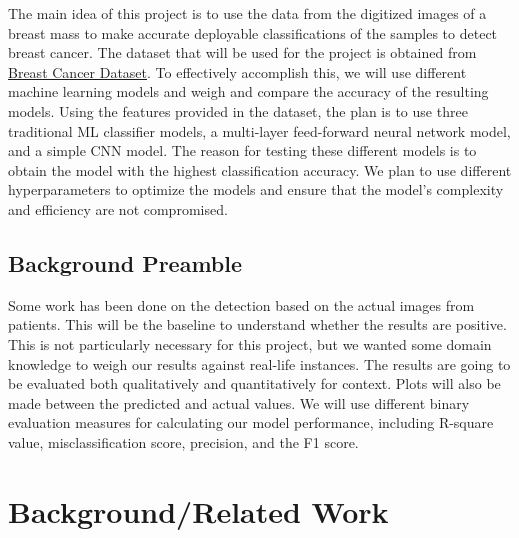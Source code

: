 \documentclass[10pt,twocolumn,letterpaper]{article}
\begin{document}
The main idea of this project is to use the data from the digitized images of a breast mass to make accurate deployable classifications of the samples to detect breast cancer. The dataset that will be used for the project is obtained from \href{http://archive.ics.uci.edu/ml/datasets/Breast+Cancer+Wisconsin+\%28Diagnostic\%29}{Breast Cancer Dataset}. To effectively accomplish this, we will use different machine learning models and weigh and compare the accuracy of the resulting models. Using the features provided in the dataset, the plan is to use three traditional ML classifier models, a multi-layer feed-forward neural network model, and a simple CNN model. The reason for testing these different models is to obtain the model with the highest classification accuracy. We plan to use different hyperparameters to optimize the models and ensure that the model's complexity and efficiency are not compromised.

\subsection{Background Preamble}

Some work has been done on the detection based on the actual images from patients. This will be the baseline to understand whether the results are positive. This is not particularly necessary for this project, but we wanted some domain knowledge to weigh our results against real-life instances. The results are going to be evaluated both qualitatively and quantitatively for context. Plots will also be made between the predicted and actual values. We will use different binary evaluation measures for calculating our model performance, including R-square value, misclassification score, precision, and the F1 score.

\section{Background/Related Work}
\label{sec:literature review}
\end{document}
